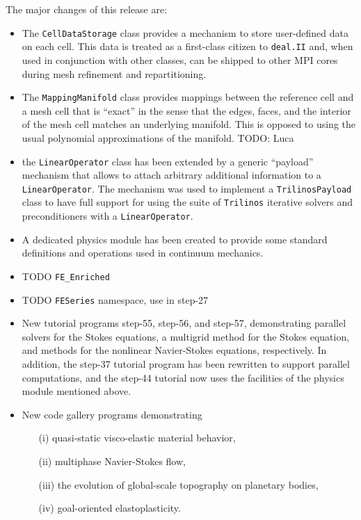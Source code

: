 \documentclass{ansarticle-preprint}
\newcommand{\specialword}[1]{\texttt{#1}}
\newcommand{\dealii}{{\specialword{deal.II}}}
\newcommand{\trilinos}{{\specialword{Trilinos}}}
\begin{document}
The major changes of this release are:
\begin{itemize}
\item The \texttt{CellDataStorage} class provides a mechanism to store
  user-defined data on each cell. This data is treated as a first-class
  citizen to \dealii{} and, when used in conjunction with other classes,
  can be shipped to other MPI cores during mesh refinement and
  repartitioning.

\item The \texttt{MappingManifold} class provides mappings between the
  reference cell and a mesh cell that is ``exact'' in the sense that
  the edges, faces, and the interior of the mesh cell matches an
  underlying manifold. This is opposed to using the usual polynomial
  approximations of the manifold.
  TODO: Luca

\item the \texttt{LinearOperator} class has been extended by a generic
  ``payload'' mechanism that allows to attach arbitrary additional
  information to a \texttt{LinearOperator}. The mechanism was used to
  implement a \texttt{TrilinosPayload} class to have full support for using
  the suite of {\trilinos} iterative solvers and preconditioners with a
  \texttt{LinearOperator}.

\item A dedicated physics module has been created to provide some standard
  definitions and operations used in continuum mechanics.

\item TODO \texttt{FE\_Enriched}

\item TODO \texttt{FESeries} namespace, use in step-27

\item New tutorial programs step-55, step-56, and step-57,
  demonstrating parallel solvers for the Stokes equations, a multigrid
  method for the Stokes equation, and methods for the nonlinear
  Navier-Stokes equations, respectively. In addition, the step-37
  tutorial program has been rewritten to support parallel
  computations, and the step-44 tutorial now uses the facilities of
  the physics module mentioned above.

\item New code gallery programs demonstrating
  \begin{enumerate}
    \item[(i)] quasi-static visco-elastic material behavior,
    \item[(ii)] multiphase Navier-Stokes flow,
    \item[(iii)] the evolution of global-scale topography on planetary bodies,
    \item[(iv)] goal-oriented elastoplasticity.
  \end{enumerate}


\end{itemize}
\end{document}
